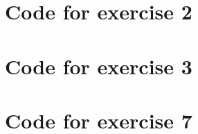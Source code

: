 \documentclass[]{article}
\begin{document}
\section{Code for exercise 2}


\section{Code for exercise 3}


\section{Code for exercise 7}

\end{document}
